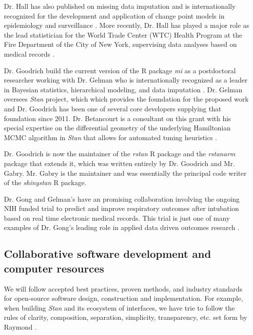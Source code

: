 \documentclass[11pt,notitlepage]{article}
\begin{document}
Dr. Hall has also published on missing data 
imputation \cite{Hall2009a, Wang_20029935, Wang_20029935} and is internationally 
recognized for the development and application of change point models in 
epidemiology and surveillance \cite{Hall2000, Hall2001, Hall2003bayesian, Hall2009, Hall2015}. 
More recently, Dr. Hall has played a major role as the lead statistician 
for the World Trade Center (WTC) Health Program at the Fire Department 
of the City of New York, supervising data analyses based on medical 
records \cite{Aldrich2010, Hall2015, Zeig-Owens2011}.

Dr. Goodrich build the current version of the R package \textit{mi} as a postdoctoral researcher working with
Dr. Gelman \cite{miCRAN} who is internationally recognized as a leader in Bayesian statistics, hierarchical 
modeling, and data imputation \cite{Gelman1998notasked, Gelman2001imputation, Hoffman2014, Gelman-Hill_2014}. 
Dr. Gelman oversees \textit{Stan}\cite{Stan_Software_2014} project, which which provides the foundation for the 
proposed work and Dr. Goodrich has been one of several core developers supplying that foundation since 2011.  
Dr. Betancourt is a consultant on this grant with his special expertise on the differential 
geometry of the underlying Hamiltonian MCMC algorithm in \textit{Stan} that allows for automated tuning heuristics
\cite{BetancourtGeometry2016}.

Dr. Goodrich is now the maintainer of the \textit{rstan} R package and the \textit{rstanarm} package that extends
it, which was written entirely by Dr. Goodrich and Mr. Gabry. Mr. Gabry is the maintainer and was essentially the
principal code writer of the \textit{shinystan} R package.

Dr. Gong and Gelman's have an promising collaboration involving the ongoing NIH funded trial to predict and 
improve respiratory outcomes after intubation based on real time electronic medical records. This trial is just
one of many examples of Dr. Gong's leading role in applied data driven outcomes research 
\cite{Gong2005, Gong2010, Gajic2011, Yu_24970344, Kor2014}. 

\subsection*{Collaborative software development and computer resources}
We will follow accepted best practices, proven methods, and industry standards for open-source software design, construction and implementation.
For example, when building \textit{Stan} and its ecosystem of interfaces, we have trie to follow the rules of clarity, composition, separation, 
simplicity, transparency, etc. set form by Raymond \cite{Raymond2003art}.
\end{document}
